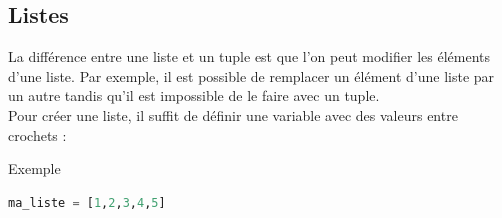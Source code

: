 
    
        
%              
    
    \subsection{Listes}
    La différence entre une liste et un tuple est que l'on peut modifier les éléments d'une liste. Par exemple, il est possible de remplacer un élément d'une liste par un autre tandis qu'il est impossible de le faire avec un tuple.
    \\
    Pour créer une liste, il suffit de définir une variable avec des valeurs entre crochets :
    \begin{Example}{\faTerminal \quad Exemple}
        \begin{lstlisting}[language=Python]
ma_liste = [1,2,3,4,5]   \end{lstlisting}
    \end{Example}
    
